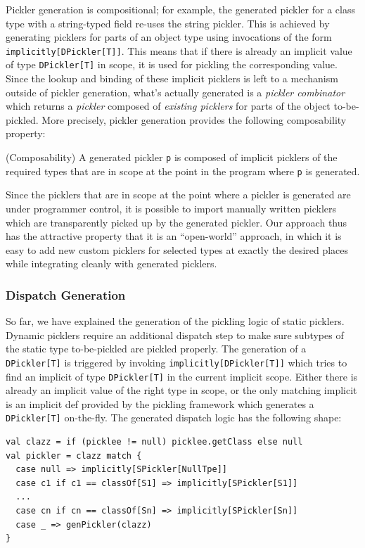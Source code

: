 \documentclass[10pt]{sigplanconf}
\theoremstyle{definition}
\theoremstyle{definition}
\newcommand{\term}[1]{\mbox{\texttt{#1}}}
\begin{document}
Pickler generation is compositional; for example, the generated pickler for a
class type with a string-typed field re-uses the string pickler. This is
achieved by generating picklers for parts of an object type using invocations
of the form \verb|implicitly[DPickler[T]]|. This means that if there is
already an implicit value of type \term{DPickler[T]} in scope, it is used for
pickling the corresponding value. Since the lookup and binding of these
implicit picklers is left to a mechanism outside of pickler generation, what's
actually generated is a {\em pickler combinator} which returns a {\em pickler}
composed of {\em existing picklers} for parts of the object to-be-pickled.
More precisely, pickler generation provides the following composability
property:

\begin{prop}{(Composability)}
A generated pickler \term{p} is composed of implicit picklers of the required
types that are in scope at the point in the program where \term{p} is
generated.
\end{prop}

Since the picklers that are in scope at the point where a pickler is generated
are under programmer control, it is possible to import manually written
picklers which are transparently picked up by the generated pickler. Our
approach thus has the attractive property that it is an ``open-world''
approach, in which it is easy to add new custom picklers for selected types at
exactly the desired places while integrating cleanly with generated picklers.

\subsubsection{Dispatch Generation}

So far, we have explained the generation of the pickling logic of static
picklers. Dynamic picklers require an additional dispatch step to make sure
subtypes of the static type to-be-pickled are pickled properly. The generation
of a \term{DPickler[T]} is triggered by invoking
\verb|implicitly[DPickler[T]]| which tries to find an implicit of type
\term{DPickler[T]} in the current implicit scope. Either there is already an
implicit value of the right type in scope, or the only matching implicit is an
implicit def provided by the pickling framework which generates a
\term{DPickler[T]} on-the-fly. The generated dispatch logic has the following
shape:

\begin{lstlisting}
val clazz = if (picklee != null) picklee.getClass else null
val pickler = clazz match {
  case null => implicitly[SPickler[NullTpe]]
  case c1 if c1 == classOf[S1] => implicitly[SPickler[S1]]
  ...
  case cn if cn == classOf[Sn] => implicitly[SPickler[Sn]]
  case _ => genPickler(clazz)
}
\end{lstlisting}
\end{document}
